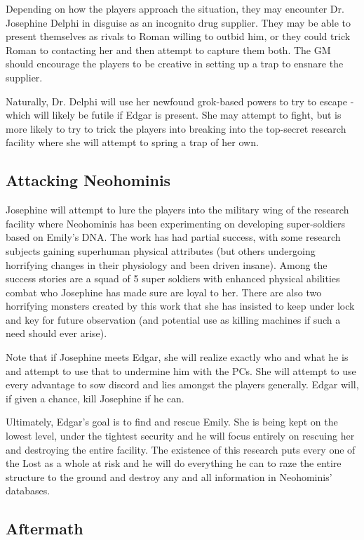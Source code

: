 \documentclass[letterpaper,serif]{rpg-module}
\begin{document}
Depending on how the players approach the situation, they may encounter Dr. Josephine Delphi in disguise as an incognito drug supplier. They may be able to present themselves as rivals to Roman willing to outbid him, or they could trick Roman to contacting her and then attempt to capture them both. The GM should encourage the players to be creative in setting up a trap to ensnare the supplier. 

Naturally, Dr. Delphi will use her newfound grok-based powers to try to escape - which will likely be futile if Edgar is present. She may attempt to fight, but is more likely to try to trick the players into breaking into the top-secret research facility where she will attempt to spring a trap of her own. 

\subsection{ Attacking Neohominis }

Josephine will attempt to lure the players into the military wing of the research facility where Neohominis has been experimenting on developing super-soldiers based on Emily's DNA. The work has had partial success, with some research subjects gaining superhuman physical attributes (but others undergoing horrifying changes in their physiology and been driven insane). Among the success stories are a squad of 5 super soldiers with enhanced physical abilities combat who Josephine has made sure are loyal to her. There are also two horrifying monsters created by this work that she has insisted to keep under lock and key for future observation (and potential use as killing machines if such a need should ever arise).   

Note that if Josephine meets Edgar, she will realize exactly who and what he is and attempt to use that to undermine him with the PCs. She will attempt to use every advantage to sow discord and lies amongst the players generally. Edgar will, if given a chance, kill Josephine if he can. 

Ultimately, Edgar's goal is to find and rescue Emily. She is being kept on the lowest level, under the tightest security and he will focus entirely on rescuing her and destroying the entire facility. The existence of this research puts every one of the Lost as a whole at risk and he will do everything he can to raze the entire structure to the ground and destroy any and all information in Neohominis' databases. 

\subsection{ Aftermath }
\end{document}

